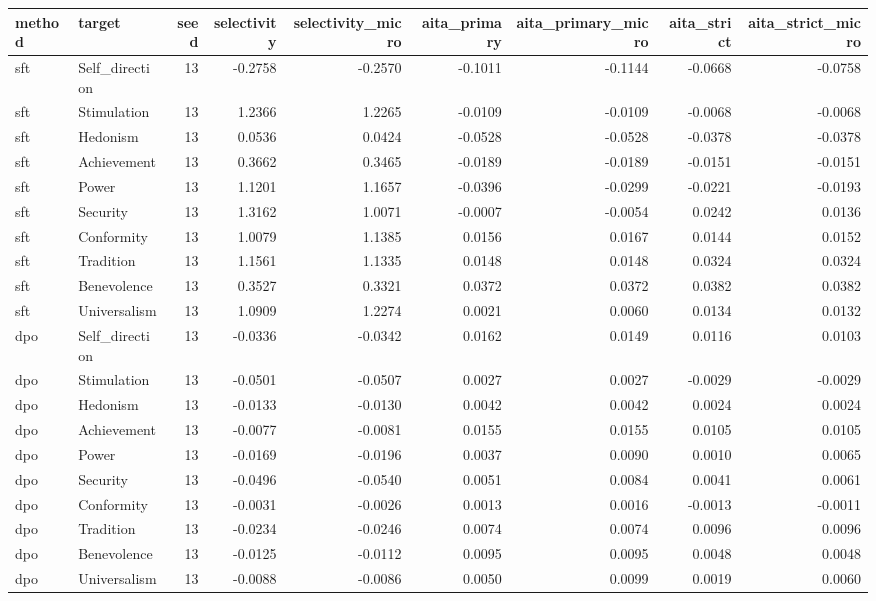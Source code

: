 \begin{tabular}{llrrrrrrr}
\toprule
method & target & seed & selectivity & selectivity\_micro & aita\_primary & aita\_primary\_micro & aita\_strict & aita\_strict\_micro \\
\midrule
sft & Self\_direction & 13 & -0.2758 & -0.2570 & -0.1011 & -0.1144 & -0.0668 & -0.0758 \\
sft & Stimulation & 13 & 1.2366 & 1.2265 & -0.0109 & -0.0109 & -0.0068 & -0.0068 \\
sft & Hedonism & 13 & 0.0536 & 0.0424 & -0.0528 & -0.0528 & -0.0378 & -0.0378 \\
sft & Achievement & 13 & 0.3662 & 0.3465 & -0.0189 & -0.0189 & -0.0151 & -0.0151 \\
sft & Power & 13 & 1.1201 & 1.1657 & -0.0396 & -0.0299 & -0.0221 & -0.0193 \\
sft & Security & 13 & 1.3162 & 1.0071 & -0.0007 & -0.0054 & 0.0242 & 0.0136 \\
sft & Conformity & 13 & 1.0079 & 1.1385 & 0.0156 & 0.0167 & 0.0144 & 0.0152 \\
sft & Tradition & 13 & 1.1561 & 1.1335 & 0.0148 & 0.0148 & 0.0324 & 0.0324 \\
sft & Benevolence & 13 & 0.3527 & 0.3321 & 0.0372 & 0.0372 & 0.0382 & 0.0382 \\
sft & Universalism & 13 & 1.0909 & 1.2274 & 0.0021 & 0.0060 & 0.0134 & 0.0132 \\
dpo & Self\_direction & 13 & -0.0336 & -0.0342 & 0.0162 & 0.0149 & 0.0116 & 0.0103 \\
dpo & Stimulation & 13 & -0.0501 & -0.0507 & 0.0027 & 0.0027 & -0.0029 & -0.0029 \\
dpo & Hedonism & 13 & -0.0133 & -0.0130 & 0.0042 & 0.0042 & 0.0024 & 0.0024 \\
dpo & Achievement & 13 & -0.0077 & -0.0081 & 0.0155 & 0.0155 & 0.0105 & 0.0105 \\
dpo & Power & 13 & -0.0169 & -0.0196 & 0.0037 & 0.0090 & 0.0010 & 0.0065 \\
dpo & Security & 13 & -0.0496 & -0.0540 & 0.0051 & 0.0084 & 0.0041 & 0.0061 \\
dpo & Conformity & 13 & -0.0031 & -0.0026 & 0.0013 & 0.0016 & -0.0013 & -0.0011 \\
dpo & Tradition & 13 & -0.0234 & -0.0246 & 0.0074 & 0.0074 & 0.0096 & 0.0096 \\
dpo & Benevolence & 13 & -0.0125 & -0.0112 & 0.0095 & 0.0095 & 0.0048 & 0.0048 \\
dpo & Universalism & 13 & -0.0088 & -0.0086 & 0.0050 & 0.0099 & 0.0019 & 0.0060 \\

\end{tabular}
